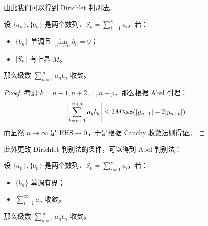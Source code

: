 由此我们可以得到 Dirichlet 判别法。

\begin{theorem}
    设 $\{a_n\}, \{b_n\}$ 是两个数列，$S_n = \sum\limits_{i = 1}^{n} a_i$，若：
    \begin{itemize}
        \item $\{b_n\}$ 单调且 $\lim\limits_{n \to \infty} b_n = 0$；
        \item $\abs{S_n}$ 有上界 $M$。
    \end{itemize}
    那么级数 $\sum\limits_{n = 1}^{\infty} a_n b_n$ 收敛。

    \begin{proof}
        考虑 $k = n + 1, n + 2, \dots, n + p$，那么根据 Abel 引理：
        $$
        \abs{\sum_{k = n + 1}^{n + p} a_k b_k} \le 2M \ab(\abs{y_{n + 1}} - 2 \abs{y_{n + p}})
        $$
        而显然 $n \to \infty$ 是 $\text{RHS} \to 0$，于是根据 Cauchy 收敛法则得证。
    \end{proof}
\end{theorem}

此外更改 Dirichlet 判别法的条件，可以得到 Abel 判别法：

\begin{theorem}
    设 $\{a_n\}, \{b_n\}$ 是两个数列，$S_n = \sum\limits_{i = 1}^{n} a_i$，若：
    \begin{itemize}
        \item $\{b_n\}$ 单调有界；
        \item $\sum_{i = 1}^{\infty} a_n$ 收敛。
    \end{itemize}
    那么级数 $\sum\limits_{n = 1}^{\infty} a_n b_n$ 收敛。
\end{theorem}